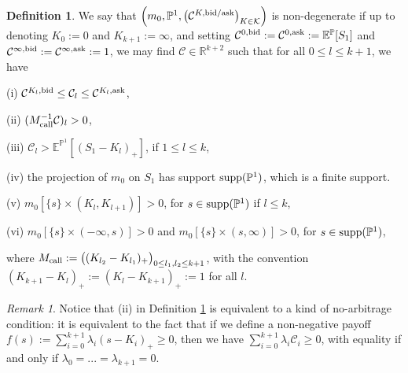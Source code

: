 \documentclass{amsart}%
\def \E{\mathbb{E}}
\def \P{{\mathbb P}}
\def \R{\mathbb{R}}
\def\Cc{{\cal C}}
\def\Kc{{\cal K}}
\def\no{\noindent}
\def\x{\times}
\theoremstyle{definition}
\newtheorem{defn}[thm]{Definition}
\theoremstyle{remark}
\newtheorem{rem}[thm]{Remark}
\newcommand{\cal}{\mathcal}
\begin{document}
\begin{defn}\label{def:non-degen}
We say that $\left(m_0, \P^1, \left(\Cc^{K,{\rm bid/ask}}\right)_{K\in\Kc}\right)$ is non-degenerate if up to denoting $K_0:=0$ and $K_{k+1}:=\infty$, and setting $\Cc^{0,{\rm bid}} := \Cc^{0,{\rm ask}} := \E^{\P}[S_1]$ and $\Cc^{\infty,{\rm bid}} := \Cc^{\infty,{\rm ask}} := 1$, we may find $\Cc\in \R^{k+2}$ such that for all $0\le l \le k+1$, we have

\no\rm{(i)} $\Cc^{K_l,{\rm bid}}\le \Cc_l\le \Cc^{K_l,{\rm ask}}$,

\no\rm{(ii)} $( M_{\rm call}^{-1}\Cc)_l>0$,

\no\rm{(iii)} $\Cc_l>\E^{\P^1}[(S_1-K_l)_+]$, if $1\le l\le k$,

\no\rm{(iv)} the projection of $m_0$ on $S_1$ has support ${\rm supp}(\P^1)$, which is a finite support.

\no\rm{(v)} $m_0[\{s\}\x (K_l, K_{l+1})]>0$, for $s\in{\rm supp}(\P^1)$ if $l\le k$,

\no\rm{(vi)} $m_0[\{s\}\x (-\infty, s)]>0$ and $m_0[\{s\}\x (s, \infty)]>0$, for $s\in{\rm supp}(\P^1)$,

\no where $ M_{\rm call}:=\big((K_{l_{2}}-K_{l_1})_+\big)_{0\le l_1,l_2\le k+1}$, with the convention $(K_{k+1}-K_l)_+ := (K_l-K_{k+1})_+ := 1$ for all $l$.
\end{defn}

\begin{rem}
Notice that {\rm (ii)} in Definition \ref{def:non-degen} is equivalent to a kind of no-arbitrage condition: it is equivalent to the fact that if we define a non-negative payoff $f(s):=\sum_{i=0}^{k+1}\lambda_i(s-K_i)_+\ge 0$, then we have $\sum_{i=0}^{k+1}\lambda_i\Cc_i\ge 0$, with equality if and only if $\lambda_0 = ...= \lambda_{k+1} = 0$.
\end{rem}
\end{document}

